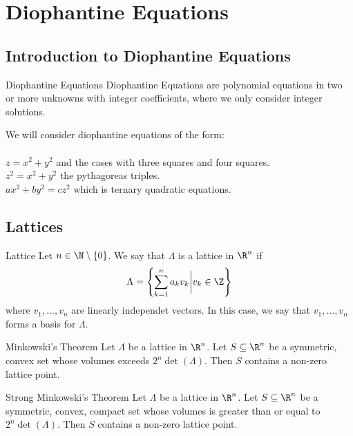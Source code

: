 \pagebreak
\section{Diophantine Equations}
\subsection{Introduction to Diophantine Equations}
\begin{defn}{Diophantine Equations}{} Diophantine Equations are polynomial equations in two or more unknowns with integer coefficients, where we only consider integer solutions. 
\end{defn}

We will consider diophantine equations of the form: \\~\\
$z=x^2+y^2$ and the cases with three squares and four squares. \\
$z^2=x^2+y^2$ the pythagoreas triples. \\
$ax^2+by^2=cz^2$ which is ternary quadratic equations. 

\subsection{Lattices}
\begin{defn}{Lattice}{} Let $n\in\N\setminus\{0\}$. We say that $\Lambda$ is a lattice in $\R^n$ if $$\Lambda=\left\{\sum_{k=1}^na_kv_k\bigg{|}v_k\in\Z\right\}$$ where $v_1,\dots,v_n$ are linearly independet vectors. In this case, we say that $v_1,\dots,v_n$ forms a basis for $\Lambda$. 
\end{defn}

\begin{thm}{Minkowski's Theorem}{} Let $\Lambda$ be a lattice in $\R^n$. Let $S\subseteq\R^n$ be a symmetric, convex set whose volumes exceeds $2^n\det(\Lambda)$. Then $S$ contains a non-zero lattice point. 
\end{thm}

\begin{crl}{Strong Minkowski's Theorem}{} Let $\Lambda$ be a lattice in $\R^n$. Let $S\subseteq\R^n$ be a symmetric, convex, compact set whose volumes is greater than or equal to $2^n\det(\Lambda)$. Then $S$ contains a non-zero lattice point. 
\end{crl}

